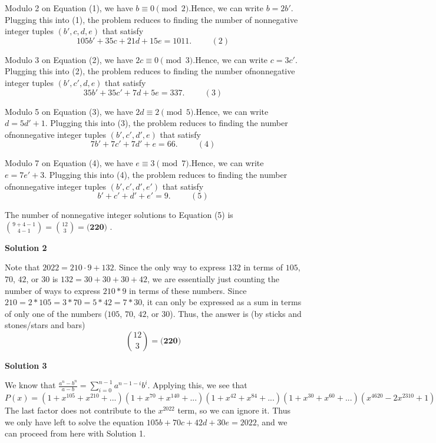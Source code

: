 \begin{enumerate}
 Modulo 2 on Equation (1), we have $b \equiv 0 \pmod{2}$.Hence, we can write $b = 2 b'$. Plugging this into (1), the problem reduces to finding the number of nonnegative integer tuples $\left( b' , c , d , e \right)$ that satisfy
 \[ 105 b' + 35 c + 21 d + 15 e = 1011 . \hspace{1cm} (2) \]

 Modulo 3 on Equation (2), we have $2 c \equiv 0 \pmod{3}$.Hence, we can write $c = 3 c'$. Plugging this into (2), the problem reduces to finding the number ofnonnegative integer tuples $\left( b' , c' , d , e \right)$ that satisfy
 \[ 35 b' + 35 c' + 7 d + 5 e = 337 . \hspace{1cm} (3) \]

 Modulo 5 on Equation (3), we have $2 d \equiv 2 \pmod{5}$.Hence, we can write $d = 5 d' + 1$. Plugging this into (3), the problem reduces to finding the number ofnonnegative integer tuples $\left( b' , c' , d' , e \right)$ that satisfy
 \[ 7 b' + 7 c' + 7 d' + e = 66 . \hspace{1cm} (4) \]

 Modulo 7 on Equation (4), we have $e \equiv 3 \pmod{7}$.Hence, we can write $e = 7 e' + 3$. Plugging this into (4), the problem reduces to finding the number ofnonnegative integer tuples $\left( b' , c' , d' , e' \right)$ that satisfy
 \[ b' + c' + d' + e' = 9 . \hspace{1cm} (5) \]

 The number of nonnegative integer solutions to Equation (5) is $\binom{9 + 4 - 1}{4 - 1} = \binom{12}{3} =  \boxed{\textbf{(220) }}$.

 



\textbf{Solution 2}

Note that $2022 = 210\cdot 9 +132$. Since the only way to express $132$ in terms of $105$, $70$, $42$, or $30$ is $132 = 30+30+30+42$, we are essentially just counting the number of ways to express $210*9$ in terms of these numbers. Since $210 = 2*105=3*70=5*42=7*30$, it can only be expressed as a sum in terms of only one of the numbers ($105$, $70$, $42$, or $30$). Thus, the answer is (by sticks and stones/stars and bars) 
 \[\binom{12}{3} = \boxed{\textbf{(220)}}\]




\textbf{Solution 3}

We know that $\frac{a^n-b^n}{a-b}=\sum_{i=0}^{n-1} a^{n-1-i}b^i$. Applying this, we see that 
 \[P(x)=(1+x^{105}+x^{210}+...)(1+x^{70}+x^{140}+...)(1+x^{42}+x^{84}+...)(1+x^{30}+x^{60}+...)(x^{4620}-2x^{2310}+1)\] The last factor does not contribute to the $x^{2022}$ term, so we can ignore it. Thus we only have left to solve the equation $105b+70c+42d+30e=2022$, and we can proceed from here with Solution 1.


\end{enumerate}
